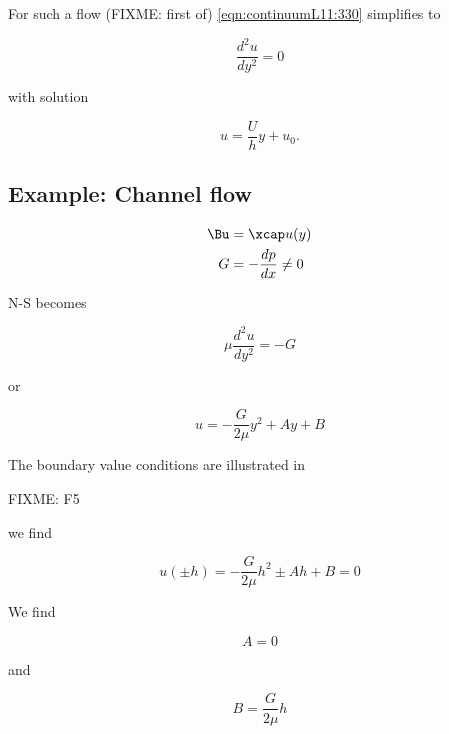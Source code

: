 For such a flow (FIXME: first of) \ref{eqn:continuumL11:330} simplifies to

\begin{equation}\label{eqn:continuumL11:530}
\frac{d^2 u}{dy^2} = 0
\end{equation}

with solution

\begin{equation}\label{eqn:continuumL11:550}
u = \frac{U}{h} y + u_0.
\end{equation}


\subsection{Example: Channel flow}

\begin{align}\label{eqn:continuumL11:570}
\Bu &= \xcap u(y) \\
G &= - \frac{dp}{dx} \ne 0
\end{align}

N-S becomes

\begin{equation}\label{eqn:continuumL11:590}
\mu \frac{d^2 u}{dy^2} = -G
\end{equation}

or

\begin{equation}\label{eqn:continuumL11:610}
u = -\frac{G}{2 \mu} y^2 + A y + B
\end{equation}

The boundary value conditions are illustrated in

FIXME: F5

we find

\begin{equation}\label{eqn:continuumL11:630}
u(\pm h) = 
-\frac{G}{2 \mu} h^2 \pm A h + B = 0
\end{equation}

We find

\begin{equation}\label{eqn:continuumL11:650}
A = 0
\end{equation}

and 

\begin{equation}\label{eqn:continuumL11:670}
B = \frac{G}{2 \mu} h
\end{equation}

